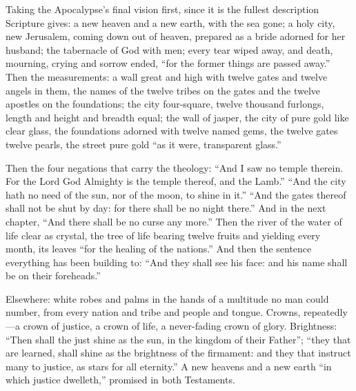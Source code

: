 Taking the Apocalypse's final vision first, since it is the fullest description Scripture gives: a new heaven and a new earth, with the sea gone; a holy city, new Jerusalem, coming down out of heaven, prepared as a bride adorned for her husband; the tabernacle of God with men; every tear wiped away, and death, mourning, crying and sorrow ended, ``for the former things are passed away.'' Then the measurements: a wall great and high with twelve gates and twelve angels in them, the names of the twelve tribes on the gates and the twelve apostles on the foundations; the city four-square, twelve thousand furlongs, length and height and breadth equal; the wall of jasper, the city of pure gold like clear glass, the foundations adorned with twelve named gems, the twelve gates twelve pearls, the street pure gold ``as it were, transparent glass.''

Then the four negations that carry the theology: ``And I saw no temple therein. For the Lord God Almighty is the temple thereof, and the Lamb.'' ``And the city hath no need of the sun, nor of the moon, to shine in it.'' ``And the gates thereof shall not be shut by day: for there shall be no night there.'' And in the next chapter, ``And there shall be no curse any more.'' Then the river of the water of life clear as crystal, the tree of life bearing twelve fruits and yielding every month, its leaves ``for the healing of the nations.'' And then the sentence everything has been building to: ``And they shall see his face: and his name shall be on their foreheads.''

Elsewhere: white robes and palms in the hands of a multitude no man could number, from every nation and tribe and people and tongue. Crowns, repeatedly---a crown of justice, a crown of life, a never-fading crown of glory. Brightness: ``Then shall the just shine as the sun, in the kingdom of their Father''; ``they that are learned, shall shine as the brightness of the firmament: and they that instruct many to justice, as stars for all eternity.'' A new heavens and a new earth ``in which justice dwelleth,'' promised in both Testaments.

